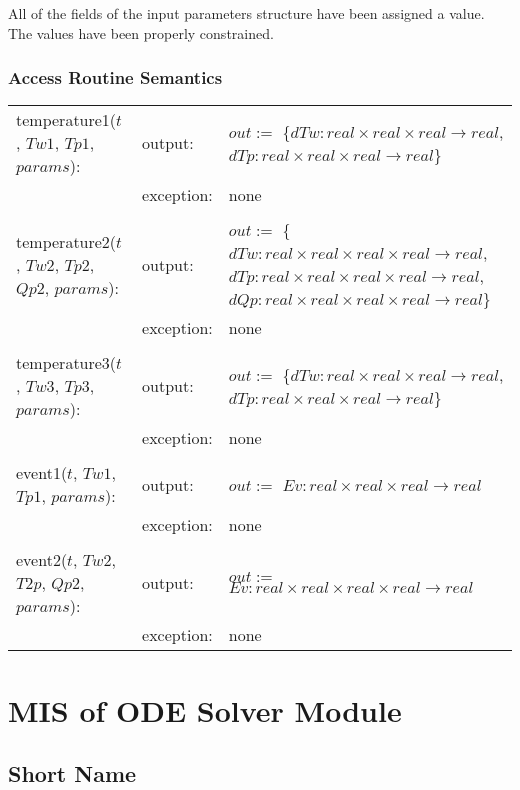 \documentclass[12pt]{article}
\begin{document}
All of the fields of the input parameters structure have been assigned a
value. The values have been properly constrained.

\subsubsection{Access Routine Semantics}

\begin{center}
\begin{tabular}{l l p{6cm}}
temperature1($t$, $Tw1$, $Tp1$, $params$): & output: & $out :=$ \{$dTw: real \times real \times real \rightarrow real$, $dTp: real \times real \times real \rightarrow real$\} \\
& exception: & none \\ \\
temperature2($t$, $Tw2$, $Tp2$, $Qp2$, $params$): & output: & $out :=$ \{$dTw: real \times real \times real \times real \rightarrow real$, $dTp: real \times real \times real \times real \rightarrow real$, $dQp: real \times real \times real \times real \rightarrow real$\} \\
& exception: & none \\ \\
temperature3($t$, $Tw3$, $Tp3$, $params$): & output: & $out :=$ \{$dTw: real \times real \times real \rightarrow real$, $dTp: real \times real \times real \rightarrow real$\} \\
& exception: & none \\ \\
event1($t$, $Tw1$, $Tp1$, $params$): & output: & $out :=$ $Ev: real \times real \times real \rightarrow real$ \\ 
& exception: & none \\ \\
event2($t$, $Tw2$, $T2p$, $Qp2$, $params$): & output: & $out :=$ $Ev: real \times real \times real \times real \rightarrow real$ \\
& exception: & none \\
\end{tabular}
\end{center}

\section{MIS of ODE Solver Module} \label{ODE}

\subsection{Short Name}
\end{document}
